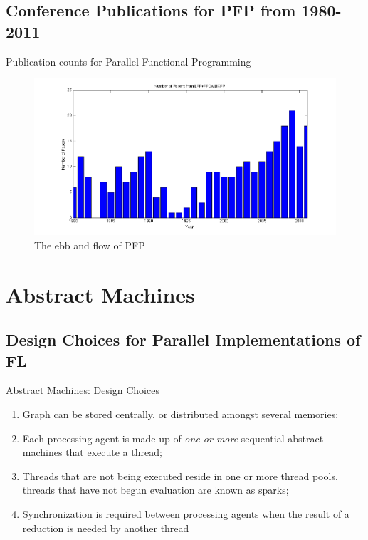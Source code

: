 \documentclass{beamer}
\begin{document}
\subsection{Conference Publications for PFP from 1980-2011}

\begin{frame}[fragile]{Publication counts for Parallel Functional Programming}{}
    \begin{figure}
    \centering
        \includegraphics[scale=.4]{figures/numPapers.png}
        \caption{The ebb and flow of PFP}
    \end{figure}

\end{frame}

\section{Abstract Machines}
\subsection[Design Choices for Parallel Implementations of Functional Languages]{Design Choices for Parallel Implementations of FL}

\begin{frame}{Abstract Machines: Design Choices \citep{clackBook}}
    \begin{enumerate}
        \item Graph can be stored centrally, or distributed amongst several memories;
\pause
        \item Each processing agent is made up of \emph{one or more} sequential abstract
                machines that execute a thread;
\pause
        \item Threads that are not being executed reside in one or more thread pools, threads
                that have not begun evaluation are known as sparks;
\pause
        \item Synchronization is required between processing agents when the result of a reduction
                is needed by another thread 
    \end{enumerate}
\end{frame}
\end{document}
